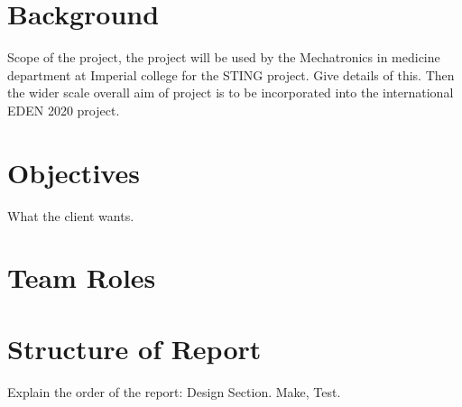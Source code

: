\section{Background}
\label{sec:background}
Scope of the project, the project will be used by the Mechatronics in medicine department at Imperial college for the STING project. Give details of this. Then the wider scale overall aim of project is to be incorporated into the international EDEN 2020 project.

\section{Objectives}
\label{sec:objectives}
What the client wants.

\section{Team Roles}
\label{sec:team_roles}


\section{Structure of Report}
\label{sec:structure_of_report}
Explain the order of the report: Design Section. Make, Test.
